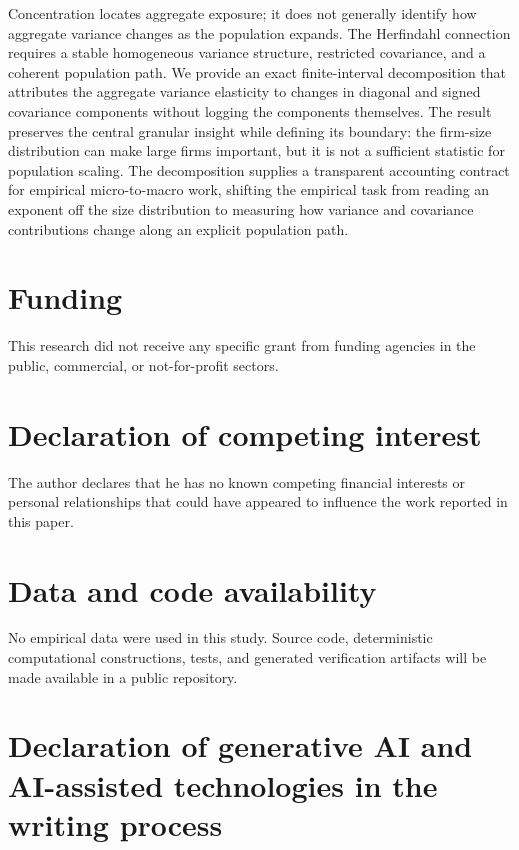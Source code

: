 \documentclass[preprint,12pt,authoryear]{elsarticle}
\begin{document}
Concentration locates aggregate exposure; it does not generally identify
how aggregate variance changes as the population expands. The
Herfindahl connection requires a stable homogeneous variance structure,
restricted covariance, and a coherent population path. We provide an
exact finite-interval decomposition that attributes the aggregate
variance elasticity to changes in diagonal and signed covariance
components without logging the components themselves. The result
preserves the central granular insight while defining its boundary: the
firm-size distribution can make large firms important, but it is not a
sufficient statistic for population scaling. The decomposition supplies
a transparent accounting contract for empirical micro-to-macro work,
shifting the empirical task from reading an exponent off the size
distribution to measuring how variance and covariance contributions
change along an explicit population path.


\section*{Funding}

This research did not receive any specific grant from funding agencies
in the public, commercial, or not-for-profit sectors.

\section*{Declaration of competing interest}

The author declares that he has no known competing financial interests
or personal relationships that could have appeared to influence the
work reported in this paper.

\section*{Data and code availability}

No empirical data were used in this study. Source code, deterministic
computational constructions, tests, and generated verification artifacts
will be made available in a public repository.

\section*{
Declaration of generative AI and AI-assisted technologies in the
writing process
}
\end{document}
